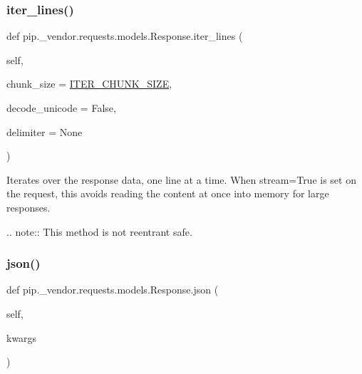 \subsubsection{\texorpdfstring{iter\+\_\+lines()}{iter\_lines()}}
{\footnotesize\ttfamily def pip.\+\_\+vendor.\+requests.\+models.\+Response.\+iter\+\_\+lines (\begin{DoxyParamCaption}\item[{}]{self,  }\item[{}]{chunk\+\_\+size = {\ttfamily \hyperlink{namespacepip_1_1__vendor_1_1requests_1_1models_a0842472b82f9b8ca12707acd13dbbe38}{I\+T\+E\+R\+\_\+\+C\+H\+U\+N\+K\+\_\+\+S\+I\+ZE}},  }\item[{}]{decode\+\_\+unicode = {\ttfamily False},  }\item[{}]{delimiter = {\ttfamily None} }\end{DoxyParamCaption})}

\begin{DoxyVerb}Iterates over the response data, one line at a time.  When
stream=True is set on the request, this avoids reading the
content at once into memory for large responses.

.. note:: This method is not reentrant safe.
\end{DoxyVerb}
 \mbox{\label{classpip_1_1__vendor_1_1requests_1_1models_1_1Response_ab1d597fec41c082432e0ee22d46e5783}} 
\subsubsection{\texorpdfstring{json()}{json()}}
{\footnotesize\ttfamily def pip.\+\_\+vendor.\+requests.\+models.\+Response.\+json (\begin{DoxyParamCaption}\item[{}]{self,  }\item[{}]{kwargs }\end{DoxyParamCaption})}

